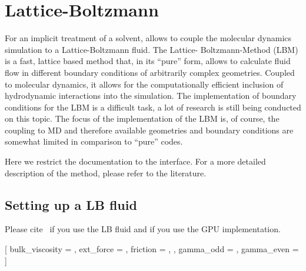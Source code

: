 %  
%   
%  
%  
%

\chapter{Lattice-Boltzmann}
\label{sec:lb}

For an implicit treatment of a solvent, \es allows to couple the
molecular dynamics simulation to a Lattice-Boltzmann fluid. The Lattice-
Boltzmann-Method (LBM) is a fast, lattice based method that, in its
``pure'' form, allows to calculate fluid flow in different boundary conditions
of arbitrarily complex geometries. Coupled to molecular dynamics, it allows for 
the computationally efficient inclusion of hydrodynamic interactions into the 
simulation. The implementation of boundary conditions for the LBM is a difficult
 task, a lot of research is still being conducted on this topic. The focus of 
the \es implementation of the LBM is, of course, the coupling to MD and 
therefore available geometries and boundary conditions are somewhat limited 
in comparison to ``pure'' codes. 

Here we restrict the documentation to the interface. For a more detailed
description of the method, please refer to the literature.

\section{Setting up a LB fluid}

\begin{citebox}
  Please cite~ if you use the LB fluid and
   if you use the GPU implementation.
\end{citebox}

\begin{pysyntax}
    [
        bulk_viscosity = ,
        ext_force = ,
        friction = ,
        ,
        gamma_odd = ,
        gamma_even = 
    ]
    \begin{features}
    \end{features}
\end{pysyntax}
        
